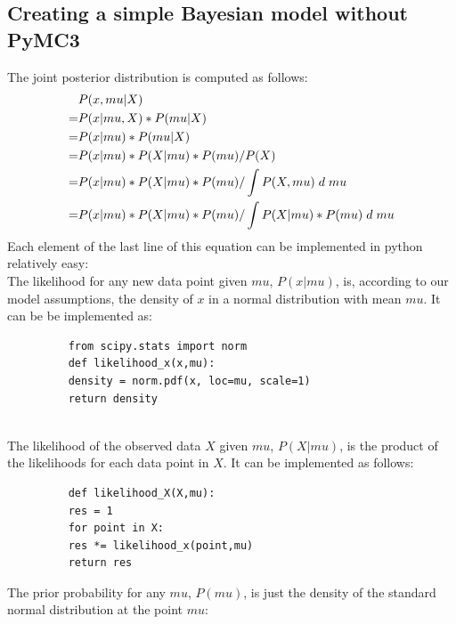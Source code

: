 \documentclass{article}
\begin{document}
\subsection{Creating a simple Bayesian model without PyMC3}
\label{subsec: Complete example of a simple Bayesian model}

The joint posterior distribution is computed as follows:
\begin{equation}
\begin{split}
&P(x,mu|X) \\
= &P(x|mu,X) * P(mu|X) \\
= &P(x|mu) * P(mu|X) \\
= &P(x|mu) * P(X|mu) * P(mu) / P(X) \\
= &P(x|mu) * P(X|mu) * P(mu) / \int P(X,mu) \hspace{1mm} d \hspace{1mm} mu \\
= &P(x|mu) * P(X|mu) * P(mu) / \int P(X|mu) * P(mu) \hspace{1mm} d \hspace{1mm} mu
\end{split}
\end{equation}
Each element of the last line of this equation can be implemented in python relatively easy: 
\\
The likelihood for any new data point given $mu$, $P(x|mu)$, is, according to our model assumptions, the density of $x$ in a normal distribution with mean $mu$. It can be be implemented as:
\begin{figure}[h]
	\begin{lstlisting}
	from scipy.stats import norm
	def likelihood_x(x,mu):
	density = norm.pdf(x, loc=mu, scale=1)
	return density
	\end{lstlisting}
	
	\label{fig:likelihood_new_data_point}
\end{figure}\\
The likelihood of the observed data $X$ given $mu$, $P(X|mu)$, is the product of the likelihoods for each data point in $X$. It can be implemented as follows: 
\begin{figure}[H]
	\begin{lstlisting}
	def likelihood_X(X,mu):
	res = 1
	for point in X:
	res *= likelihood_x(point,mu)
	return res
	\end{lstlisting}
	\label{fig:likelihood_observed_data}
\end{figure}
The prior probability for any $mu$, $P(mu)$, is just the density of the standard normal distribution at the point $mu$:
\end{document}
